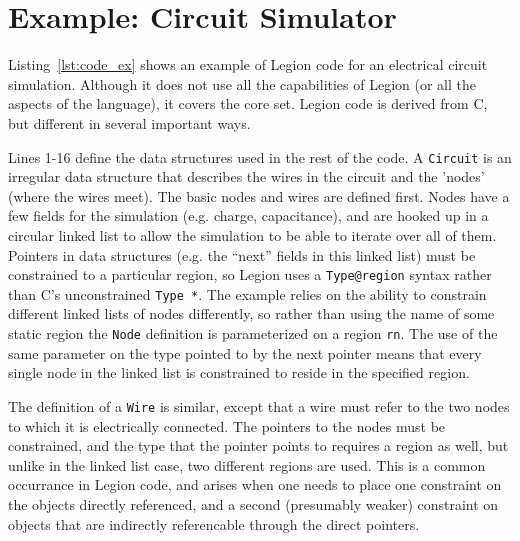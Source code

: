 \section{Example: Circuit Simulator}

%

Listing~\ref{lst:code_ex} shows an example of Legion code for an electrical
circuit simulation.  Although it does not use all the capabilities of Legion
(or all the aspects of the language), it covers the core set.  Legion code is
derived from C, but different in several important ways.

Lines 1-16 
define the data structures used in the rest of the code.  A {\tt Circuit}
is an irregular data structure that describes the wires in the circuit and
the 'nodes' (where the wires meet).  The basic nodes and wires are defined
first.  Nodes have a few fields for the simulation (e.g. charge, capacitance),
and are hooked up in a circular linked list to allow the simulation to be
able to iterate over all of them.  Pointers in data structures (e.g. the
``next'' fields in this linked list) must be constrained
to a particular region, so Legion uses a {\tt Type@region} syntax rather than
C's unconstrained {\tt Type~*}.  The example relies on the ability to
constrain different linked lists of nodes differently, so rather than using
the name of some static region the {\tt Node} definition is parameterized on
a region {\tt rn}.  The use of the same parameter on the type pointed to by
the next pointer means that every single node in the linked list is constrained
to reside in the specified region.

The definition of a {\tt Wire} is similar, except that a wire must refer to
the two nodes to which it is electrically connected.  The pointers to the nodes
must be constrained, and the type that the pointer points to requires a region
as well, but unlike in the linked list case, two different regions are used.
This is a common occurrance in Legion code, and arises when one needs to place
one constraint on the objects directly referenced, and a second (presumably
weaker) constraint on objects that are indirectly referencable through the
direct pointers.

